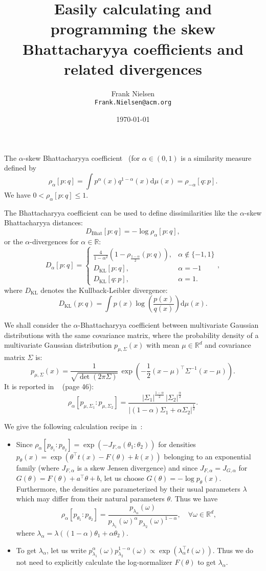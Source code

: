 \documentclass[11pt]{article}
\title{Easily calculating and programming the skew Bhattacharyya coefficients and related divergences}
\date{\today}
\author{Frank Nielsen\\ {\tt Frank.Nielsen@acm.org}}
\def\dmu{\mathrm{d}\mu}
\def\bbR{\mathbb{R}}
\def\KL{\mathrm{KL}}
\def\Bhat{\mathrm{Bhat}}
\begin{document}
\maketitle


The $\alpha$-skew Bhattacharyya coefficient~\cite{BR-2011} (for $\alpha\in(0,1)$ is a similarity measure defined by
$$
\rho_\alpha[p:q]=\int p^\alpha(x)q^{1-\alpha}(x) \dmu(x)=\rho_{-\alpha}[q:p].
$$
We have $0<\rho_\alpha[p:q]\leq 1$.

The Bhattacharyya coefficient can be used to define dissimilarities like the $\alpha$-skew Bhattacharyya distances:
$$
D_{\Bhat}[p:q]=-\log \rho_\alpha[p:q],
$$
or the $\alpha$-divergences for $\alpha\in\bbR$:
$$
D_\alpha[p:q]=\left\{
\begin{array}{ll}
\frac{4}{1-\alpha^2}\left(1-\rho_{\frac{1-\alpha}{2}}(p:q)\right), & \alpha\not\in\{-1,1\}\\
D_\KL[p:q], & \alpha=-1\\
D_\KL[q:p], & \alpha=1.
\end{array}
\right.,
$$
where $D_\KL$ denotes the Kullback-Leibler divergence:
$$
D_\KL(p:q)=\int p(x)\log\left(\frac{p(x)}{q(x)}\right) \dmu(x).
$$

We shall consider the $\alpha$-Bhattacharyya coefficient between multivariate Gaussian distributions with the same covariance matrix,
where the probability density of a multivariate Gaussian distribution $p_{\mu,\Sigma}(x)$ with mean $\mu\in\bbR^d$ and covariance matrix $\Sigma$ is:
$$
p_{\mu,\Sigma}(x)=\frac{1}{\sqrt{\det(2\pi\Sigma)}}\, \exp\left(-\frac{1}{2}(x-\mu)^\top \Sigma^{-1} (x-\mu)\right). 
$$
It is  reported in ~\cite{pardo2018statistical} (page 46):
$$
\rho_\alpha[p_{\mu,\Sigma_1}:p_{\mu,\Sigma_2}]=\frac{\lvert\Sigma_1\rvert^{\frac{1-\alpha}{2}}\, \lvert\Sigma_2\rvert^{\frac{\alpha}{2}}}{
\lvert (1-\alpha)\Sigma_1+\alpha\Sigma_2\rvert^{\frac{1}{2}}}.
$$

We give the following calculation recipe in~\cite{CF-2020}:

\begin{itemize}
	\item Since $\rho_\alpha[p_{\theta_1}:p_{\theta_2}]=\exp(-J_{F,\alpha}(\theta_1:\theta_2))$ for densities $p_\theta(x)=\exp(\theta^\top t(x)-F(\theta)+k(x))$ belonging to an exponential family (where $J_{F,\alpha}$ is a skew Jensen divergence) 
	and since $J_{F,\alpha}=J_{G,\alpha}$ for $G(\theta)=F(\theta)+a^\top\theta+b$, let us choose $G(\theta)=-\log p_\theta(x)$.
	Furthermore, the densities are parameterized by their usual parameters $\lambda$ which may differ from their natural parameters $\theta$. 
	Thus we have
	$$
	\rho_\alpha[p_{\theta_1}:p_{\theta_2}]=\frac{p_{\lambda_\alpha}(\omega)}{p_{\lambda_1}(\omega)^\alpha\, p_{\lambda_2}(\omega)^{1-\alpha}},\quad\forall\omega\in\bbR^d,
	$$
	where $\lambda_\alpha=\lambda((1-\alpha)\theta_1+\alpha\theta_2)$.
	
	\item To get $\lambda_\alpha$, let us write $p_{\lambda_1}^\alpha(\omega) p_{\lambda_2}^{1-\alpha}(\omega)\propto \exp(\lambda_\alpha^\top t(\omega))$.
	Thus we do not need to explicitly calculate the log-normalizer $F(\theta)$ to get $\lambda_\alpha$.
\end{itemize}
\end{document}
